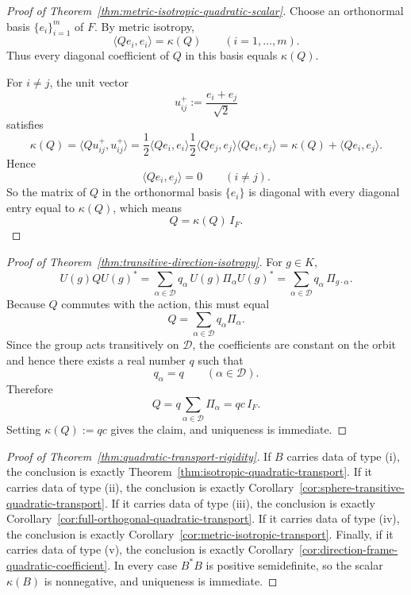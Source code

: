 \begin{proof}[Proof of Theorem~\ref{thm:metric-isotropic-quadratic-scalar}]
\label{proof:thm:metric-isotropic-quadratic-scalar}
Choose an orthonormal basis $\{e_i\}_{i=1}^m$ of $F$. By metric isotropy,
\[
\langle Qe_i,e_i\rangle=\kappa(Q)
\qquad(i=1,\dots,m).
\]
Thus every diagonal coefficient of $Q$ in this basis equals $\kappa(Q)$.

For $i\neq j$, the unit vector
\[
u_{ij}^{+}:=\frac{e_i+e_j}{\sqrt2}
\]
satisfies
\[
\kappa(Q)=\langle Qu_{ij}^{+},u_{ij}^{+}\rangle
=
\frac12\langle Qe_i,e_i\rangle
\frac12\langle Qe_j,e_j\rangle
\langle Qe_i,e_j\rangle
=
\kappa(Q)+\langle Qe_i,e_j\rangle.
\]
Hence
\[
\langle Qe_i,e_j\rangle=0
\qquad(i\neq j).
\]
So the matrix of $Q$ in the orthonormal basis $\{e_i\}$ is diagonal with every
diagonal entry equal to $\kappa(Q)$, which means
\[
Q=\kappa(Q)\,I_F.
\]
\end{proof}

\begin{proof}[Proof of Theorem~\ref{thm:transitive-direction-isotropy}]
\label{proof:thm:transitive-direction-isotropy}
For $g\in K$,
\[
U(g)QU(g)^*
=
\sum_{\alpha\in\mathcal D} q_{\alpha}\,U(g)\Pi_{\alpha}U(g)^*
=
\sum_{\alpha\in\mathcal D} q_{\alpha}\,\Pi_{g\cdot\alpha}.
\]
Because $Q$ commutes with the action, this must equal
\[
Q=\sum_{\alpha\in\mathcal D} q_{\alpha}\Pi_{\alpha}.
\]
Since the group acts transitively on $\mathcal D$, the coefficients are
constant on the orbit and hence there exists a real number $q$ such that
\[
q_{\alpha}=q
\qquad(\alpha\in\mathcal D).
\]
Therefore
\[
Q=q\sum_{\alpha\in\mathcal D}\Pi_{\alpha}=qc\,I_F.
\]
Setting $\kappa(Q):=qc$ gives the claim, and uniqueness is immediate.
\end{proof}

\begin{proof}[Proof of Theorem~\ref{thm:quadratic-transport-rigidity}]
\label{proof:thm:quadratic-transport-rigidity}
If $B$ carries data of type (i), the conclusion is exactly
Theorem~\ref{thm:isotropic-quadratic-transport}. If it carries data of type
(ii), the conclusion is exactly
Corollary~\ref{cor:sphere-transitive-quadratic-transport}. If it carries data
of type (iii), the conclusion is exactly
Corollary~\ref{cor:full-orthogonal-quadratic-transport}. If it carries data of
type (iv), the conclusion is exactly
Corollary~\ref{cor:metric-isotropic-transport}. Finally, if it carries data of
type (v), the conclusion is exactly
Corollary~\ref{cor:direction-frame-quadratic-coefficient}. In every case
$B^*B$ is positive semidefinite, so the scalar $\kappa(B)$ is nonnegative, and
uniqueness is immediate.
\end{proof}

